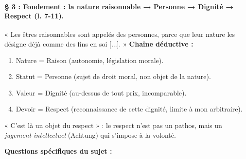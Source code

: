 \documentclass[11pt]{article}
\begin{document}
\begin{corrige}
\paragraph{§ 3 : Fondement : la nature raisonnable → Personne → Dignité → Respect (l. 7-11).} « Les êtres raisonnables sont appelés des personnes, parce que leur nature les désigne déjà comme des fins en soi [...]. » \textbf{Chaîne déductive :}
\begin{enumerate}
\item Nature = Raison (autonomie, législation morale).
\item Statut = Personne (sujet de droit moral, non objet de la nature).
\item Valeur = Dignité (au-dessus de tout prix, incomparable).
\item Devoir = Respect (reconnaissance de cette dignité, limite à mon arbitraire).
\end{enumerate}
« C'est là un objet du respect » : le respect n'est pas un pathos, mais un \emph{jugement intellectuel} (Achtung) qui s'impose à la volonté.

\textbf{Questions spécifiques du sujet :}


\end{corrige}
\end{document}
